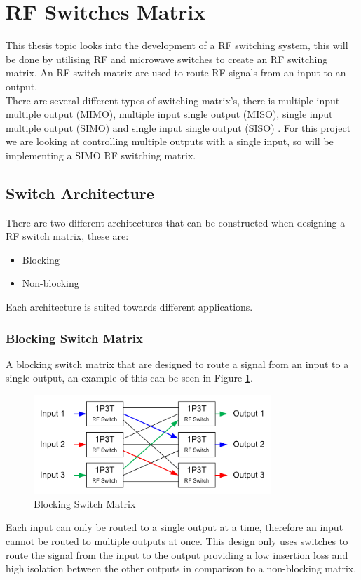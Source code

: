 \documentclass[12pt,openany,a4paper]{book}
\begin{document}
\section{RF Switches Matrix}
This thesis topic looks into the development of a RF switching system, this will be done by utilising RF and microwave switches to create an RF switching matrix. An RF switch matrix are used to route RF signals from an input to an output.\\
There are several different types of switching matrix's, there is multiple input multiple output (MIMO), multiple input single output (MISO), single input multiple output (SIMO) and single input single output (SISO) \cite{ref12}. For this project we are looking at controlling multiple outputs with a single input, so will be implementing a SIMO RF switching matrix.


\subsection{Switch Architecture}
There are two different architectures that can be constructed when designing a RF switch matrix, these are:\\[-0.8cm]
\begin{itemize}
	\setlength\itemsep{-0.5em}
	\item Blocking 
	\item Non-blocking
\end{itemize}
Each architecture is suited towards different applications. 
 
\subsubsection{Blocking Switch Matrix}
A blocking switch matrix that are designed to route a signal from an input to a single output, an example of this can be seen in Figure \ref{fig:blocking}.
\begin{figure}[H]
	\centering
    \includegraphics[width=0.8\textwidth]{blockingmatrix.jpg}
	\caption{Blocking Switch Matrix}
	\label{fig:blocking}
\end{figure} 
Each input can only be routed to a single output at a time, therefore an input cannot be routed to multiple outputs at once. This design only uses switches to route the signal from the input to the output providing a low insertion loss and high isolation between the other outputs in comparison to a non-blocking matrix.
\end{document}
